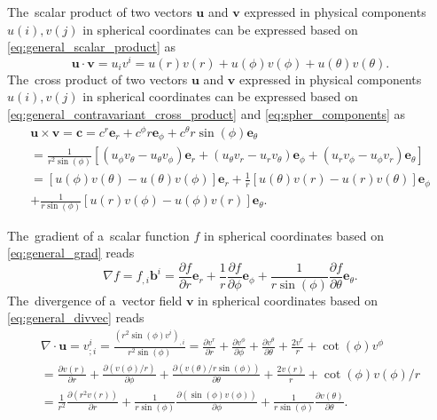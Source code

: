 \documentclass[review]{elsarticle}
\newcommand{\pdv}[2]{\frac{\partial{#1}}{\partial{#2}}}
\newcommand{\vect}[1]{\boldsymbol{#1}}
\begin{document}
The~scalar product of two vectors $\vect{u}$ and $\vect{v}$ expressed 
in physical components $u(i), v(j)$ in spherical coordinates can be expressed 
based on \eqref{eq:general_scalar_product} as
\begin{equation}
  \vect{u}\cdot\vect{v} = u_i v^i = u(r)v(r) + u(\phi)v(\phi) 
  + u(\theta)v(\theta) .
  \label{eq:spher_scalar_product}
\end{equation}
The~cross product of two vectors $\vect{u}$ and $\vect{v}$ expressed 
in physical components $u(i), v(j)$ in spherical coordinates can be expressed 
based on \eqref{eq:general_contravariant_cross_product} 
and \eqref{eq:spher_components} as
\begin{multline}
  \vect{u}\times\vect{v} = \vect{c} = c^r \vect{e}_r + c^\phi r \vect{e}_\phi
  + c^\theta r\sin(\phi) \vect{e}_\theta \\
  = \frac{1}{r^2\sin(\phi)}\left[
  (u_\phi v_\theta - u_\theta v_\phi) \vect{e}_r 
  +  (u_\theta v_r - u_r v_\theta) \vect{e}_\phi
  +  (u_r v_\phi - u_\phi v_r)\vect{e}_\theta
  \right] \\
 = [u(\phi) v(\theta) - u(\theta) v(\phi)] \vect{e}_r
 +  \frac{1}{r}[u(\theta) v(r) - u(r) v(\theta)] \vect{e}_\phi \\
 + \frac{1}{r\sin(\phi)} [u(r) v(\phi) - u(\phi) v(r)]\vect{e}_\theta .
 \label{eq:spher_cross_product}
\end{multline}

The~gradient of a~scalar function $f$ in spherical coordinates based on 
\eqref{eq:general_grad} reads
\begin{equation}
  \nabla f = f_{,i}\vect{b}^i = \pdv{f}{r}\vect{e}_r 
  + \frac{1}{r}\pdv{f}{\phi}\vect{e}_\phi
  + \frac{1}{r\sin(\phi)}\pdv{f}{\theta}\vect{e}_{\theta} .
  \label{eq:spher_gradf}
\end{equation}
The~divergence of a~vector field $\vect{v}$ in spherical coordinates based on
\eqref{eq:general_divvec} reads
\begin{multline}
  \nabla\cdot\vect{u} = v^i_{;i} = 
  \frac{(r^2\sin(\phi)v^i)_{,i}}{r^2\sin(\phi)}
  = \pdv{v^r}{r} + \pdv{v^\phi}{\phi} + \pdv{v^\theta}{\theta} 
  + \frac{2v^r}{r} + \cot(\phi) v^\phi \\
  = \pdv{v(r)}{r} + \pdv{(v(\phi)/r)}{\phi} 
  + \pdv{(v(\theta)/r\sin(\phi))}{\theta} 
  + \frac{2 v(r)}{r} + \cot(\phi) v(\phi)/r \\
  = \frac{1}{r^2}\pdv{(r^2v(r))}{r} 
  + \frac{1}{r\sin(\phi)}\pdv{(\sin(\phi)v(\phi))}{\phi} 
  + \frac{1}{r\sin(\phi)}\pdv{v(\theta)}{\theta} .
  \label{eq:spher_gradf}
\end{multline}
\end{document}
